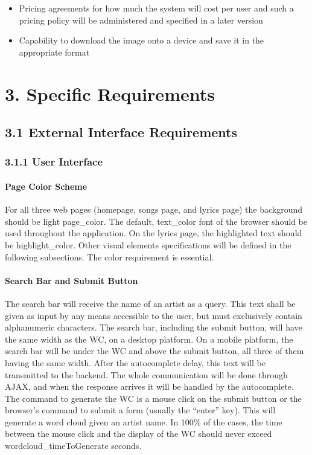 \documentclass[]{article}
\begin{document}
\begin{itemize}
\itemsep1pt\parskip0pt
\item
  Pricing agreements for how much the system will cost per user and such
  a pricing policy will be administered and specified in a later version
\item
  Capability to download the image onto a device and save it in the
  appropriate format
\end{itemize}

\section{3. Specific Requirements}\label{specific-requirements}

\subsection{3.1 External Interface
Requirements}\label{external-interface-requirements}

\subsubsection{3.1.1 User Interface}\label{user-interface}

\paragraph{Page Color Scheme}\label{page-color-scheme}

For all three web pages (homepage, songs page, and lyrics page) the
background should be light page\_color. The default, text\_color font of
the browser should be used throughout the application. On the lyrics
page, the highlighted text should be highlight\_color. Other visual
elements specifications will be defined in the following subsections.
The color requirement is essential.

\paragraph{Search Bar and Submit
Button}\label{search-bar-and-submit-button}

The search bar will receive the name of an artist as a query. This text
shall be given as input by any means accessible to the user, but must
exclusively contain alphanumeric characters. The search bar, including
the submit button, will have the same width as the WC, on a desktop
platform. On a mobile platform, the search bar will be under the WC and
above the submit button, all three of them having the same width. After
the autocomplete delay, this text will be transmitted to the backend.
The whole communication will be done through AJAX, and when the response
arrives it will be handled by the autocomplete. The command to generate
the WC is a mouse click on the submit button or the browser's command to
submit a form (usually the ``enter'' key). This will generate a word
cloud given an artist name. In 100\% of the cases, the time between the
mouse click and the display of the WC should never exceed
wordcloud\_timeToGenerate seconds.
\end{document}
